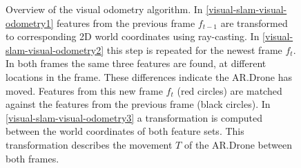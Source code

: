 \begin{figure}[htb!]
  \begin{center}
 \end{center}
  \caption{Overview of the visual odometry algorithm. In \ref{visual-slam-visual-odometry1} features from the previous frame $f_{t-1}$ are transformed to corresponding 2D world coordinates using ray-casting. In \ref{visual-slam-visual-odometry2} this step is repeated for the newest frame $f_t$. In both frames the same three features are found, at different locations in the frame. These differences indicate the AR.Drone has moved. Features from this new frame $f_t$ (red circles) are matched against the features from the previous frame (black circles). In \ref{visual-slam-visual-odometry3} a transformation is computed between the world coordinates of both feature sets. This transformation describes the movement $T$ of the AR.Drone between both frames.}
  \label{visual-slam-visual-odometry}
\end{figure}



